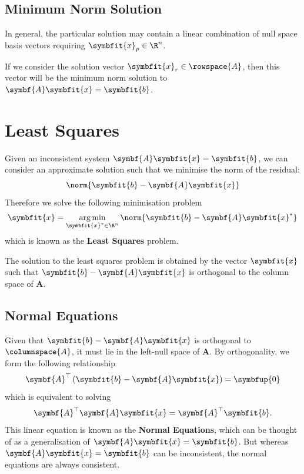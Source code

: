 \documentclass{article}
\DeclareMathOperator*{\argmin}{arg\,min}
\begin{document}
\subsection{Minimum Norm Solution}
In general, the particular solution may contain a linear combination of
null space basis vectors requiring \(\symbfit{x}_p \in \R^n\).

If we consider the solution vector \(\symbfit{x}_r \in \rowspace{A}\), then this vector
will be the minimum norm solution to \(\symbf{A}\symbfit{x} = \symbfit{b}\).
\section{Least Squares}
Given an inconsistent system \(\symbf{A}\symbfit{x} = \symbfit{b}\), we can consider an approximate solution such that we
minimise the norm of the residual:
\begin{equation*}
    \norm{\symbfit{b} - \symbf{A}\symbfit{x}}
\end{equation*}
Therefore we solve the following minimisation problem
\begin{equation*}
    \symbfit{x} = \argmin_{\symbfit{x}^\ast \in \R^n} \norm{\symbfit{b} - \symbf{A}\symbfit{x}^\ast}
\end{equation*}
which is known as the \textbf{Least Squares} problem.
\begin{theorem}
    The solution to the least squares problem is obtained by the vector \(\symbfit{x}\) such
    that \(\symbfit{b} - \symbf{A}\symbfit{x}\) is orthogonal to the column space of \(\symbf{A}\).
\end{theorem}
\subsection{Normal Equations}
Given that \(\symbfit{b} - \symbf{A}\symbfit{x}\) is orthogonal to \(\columnspace{A}\), it must lie in the
left-null space of \(\symbf{A}\). By orthogonality, we form the following relationship
\begin{equation*}
    \symbf{A}^\top \left( \symbfit{b} - \symbf{A}\symbfit{x} \right) = \symbfup{0}
\end{equation*}
which is equivalent to solving
\begin{equation*}
    \symbf{A}^\top \symbf{A}\symbfit{x} = \symbf{A}^\top \symbfit{b}.
\end{equation*}
This linear equation is known as the \textbf{Normal Equations}, which can be thought of as
a \linebreak generalisation of \(\symbf{A}\symbfit{x} = \symbfit{b}\). But whereas \(\symbf{A}\symbfit{x} = \symbfit{b}\)
can be inconsistent, the normal equations are always consistent.
\end{document}
